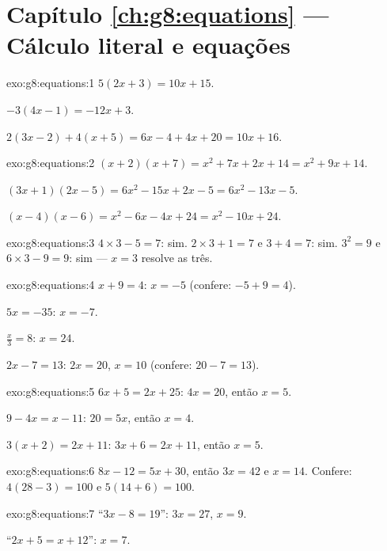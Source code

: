 \section*{Capítulo \ref{ch:g8:equations} --- Cálculo literal e equações}

\begin{solution}{exo:g8:equations:1}
$5(2x + 3) = 10x + 15$.

$-3(4x - 1) = -12x + 3$.

$2(3x - 2) + 4(x + 5) = 6x - 4 + 4x + 20 = 10x + 16$.
\end{solution}

\begin{solution}{exo:g8:equations:2}
$(x+2)(x+7) = x^2 + 7x + 2x + 14 = x^2 + 9x + 14$.

$(3x+1)(2x-5) = 6x^2 - 15x + 2x - 5 = 6x^2 - 13x - 5$.

$(x-4)(x-6) = x^2 - 6x - 4x + 24 = x^2 - 10x + 24$.
\end{solution}

\begin{solution}{exo:g8:equations:3}
$4 \times 3 - 5 = 7$: sim. \quad
$2 \times 3 + 1 = 7$ e $3 + 4 = 7$: sim. \quad
$3^2 = 9$ e $6 \times 3 - 9 = 9$: sim --- $x = 3$ resolve as três.
\end{solution}

\begin{solution}{exo:g8:equations:4}
$x + 9 = 4$: $x = -5$ (confere: $-5 + 9 = 4$).

$5x = -35$: $x = -7$.

$\frac x3 = 8$: $x = 24$.

$2x - 7 = 13$: $2x = 20$, $x = 10$ (confere: $20 - 7 = 13$).
\end{solution}

\begin{solution}{exo:g8:equations:5}
$6x + 5 = 2x + 25$: $4x = 20$, então $x = 5$.

$9 - 4x = x - 11$: $20 = 5x$, então $x = 4$.

$3(x + 2) = 2x + 11$: $3x + 6 = 2x + 11$, então $x = 5$.
\end{solution}

\begin{solution}{exo:g8:equations:6}
$8x - 12 = 5x + 30$, então $3x = 42$ e $x = 14$. Confere:
$4(28 - 3) = 100$ e $5(14 + 6) = 100$.
\end{solution}

\begin{solution}{exo:g8:equations:7}
``$3x - 8 = 19$'': $3x = 27$, $x = 9$.

``$2x + 5 = x + 12$'': $x = 7$.
\end{solution}

